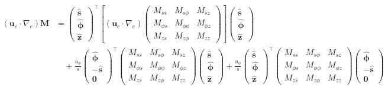 \begin{equation}\label{eqn:u-dot-grad-M-cyl}
\begin{aligned}
    (\mathbf{u}_e\cdot \nabla_e) \mathbf{M} &= \begin{pmatrix}\hat{\mathbf{s}} \\ \hat{\bm{\phi}} \\ \hat{\mathbf{z}}\end{pmatrix}^\top 
    \left[\left(\mathbf{u}_e\cdot \nabla_e\right) \begin{pmatrix}
        M_{ss} & M_{s\phi} & M_{sz} \\ 
        M_{\phi s} & M_{\phi\phi} & M_{\phi z} \\ 
        M_{zs} & M_{z\phi} & M_{zz}
    \end{pmatrix}\right]
    \begin{pmatrix}\hat{\mathbf{s}} \\ \hat{\bm{\phi}} \\ \hat{\mathbf{z}}\end{pmatrix} \\ 
    &\quad + \frac{u_\phi}{s} \begin{pmatrix} \hat{\bm{\phi}} \\ -\hat{\mathbf{s}} \\ \mathbf{0}\end{pmatrix}^\top \begin{pmatrix}
        M_{ss} & M_{s\phi} & M_{sz} \\ 
        M_{\phi s} & M_{\phi\phi} & M_{\phi z} \\ 
        M_{zs} & M_{z\phi} & M_{zz}
    \end{pmatrix} \begin{pmatrix}\hat{\mathbf{s}} \\ \hat{\bm{\phi}} \\ \hat{\mathbf{z}}\end{pmatrix} 
    + \frac{u_\phi}{s} \begin{pmatrix}\hat{\mathbf{s}} \\ \hat{\bm{\phi}} \\ \hat{\mathbf{z}}\end{pmatrix}^\top \begin{pmatrix}
        M_{ss} & M_{s\phi} & M_{sz} \\ 
        M_{\phi s} & M_{\phi\phi} & M_{\phi z} \\ 
        M_{zs} & M_{z\phi} & M_{zz}
    \end{pmatrix} \begin{pmatrix} \hat{\bm{\phi}} \\ -\hat{\mathbf{s}} \\ \mathbf{0}\end{pmatrix} \\ 

\end{aligned}
\end{equation}
